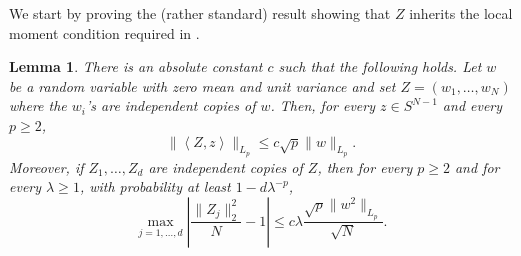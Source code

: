 \documentclass[11pt]{amsart}
\newcommand{\inr}[1]{\left\langle #1 \right\rangle}
\newtheorem{lemma}[theorem]{Lemma}
\theoremstyle{definition}
\numberwithin{equation}{section}
\begin{document}
We start by proving the (rather standard) result showing that $Z$ inherits the local moment condition required in \cite{bartl2022random}.


\begin{lemma}
\label{lem:local.psi.alpha}
	There is an absolute constant $c$ such that the following holds.
	Let $w$ be a random variable with zero mean and unit variance and set $Z=(w_{1},\dots, w_{N})$ where the $w_{i}$'s are independent  copies of $w$.
	Then, for every $z\in S^{N-1}$ and every  $p\geq 2$,
	\[\|\inr{Z,z}\|_{L_p}\leq c \sqrt{p} \|w\|_{L_{p}}.\]
	Moreover, if $Z_{1},\dots, Z_{d}$ are independent copies of $Z$, then for every $p\geq 2$ and for every $\lambda \geq 1$,  with probability at least $1-d\lambda^{-p}$,
	\[ \max_{j=1,\dots,d }\left| \frac{ \|Z_{j}\|_{2}^{2} }{N} - 1 \right| 
	\leq  c \lambda   \frac{ \sqrt p \|w^{2}\|_{L_p} }{\sqrt N} .\]
\end{lemma}
\end{document}
